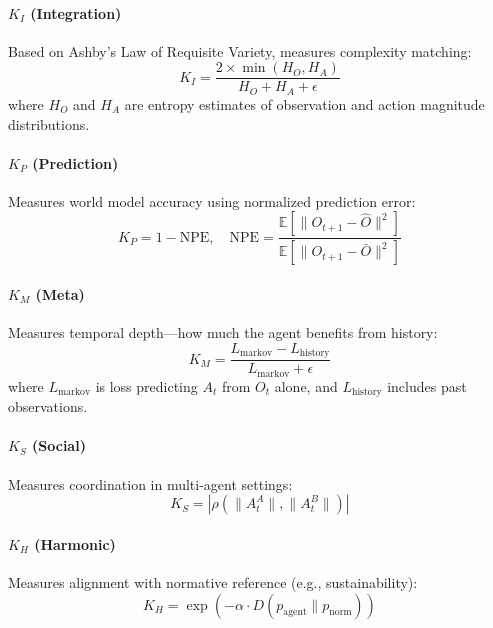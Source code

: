 \documentclass[11pt,a4paper]{article}
\newcommand{\ki}{K_I}
\newcommand{\kp}{K_P}
\newcommand{\km}{K_M}
\newcommand{\ks}{K_S}
\newcommand{\kh}{K_H}
\begin{document}
\paragraph{$\ki$ (Integration)} Based on Ashby's Law of Requisite Variety, measures complexity matching:
\begin{equation}
\ki = \frac{2 \times \min(H_O, H_A)}{H_O + H_A + \epsilon}
\end{equation}
where $H_O$ and $H_A$ are entropy estimates of observation and action magnitude distributions.

\paragraph{$\kp$ (Prediction)} Measures world model accuracy using normalized prediction error:
\begin{equation}
\kp = 1 - \text{NPE}, \quad \text{NPE} = \frac{\mathbb{E}[\|O_{t+1} - \hat{O}\|^2]}{\mathbb{E}[\|O_{t+1} - \bar{O}\|^2]}
\end{equation}

\paragraph{$\km$ (Meta)} Measures temporal depth---how much the agent benefits from history:
\begin{equation}
\km = \frac{L_{\text{markov}} - L_{\text{history}}}{L_{\text{markov}} + \epsilon}
\end{equation}
where $L_{\text{markov}}$ is loss predicting $A_t$ from $O_t$ alone, and $L_{\text{history}}$ includes past observations.

\paragraph{$\ks$ (Social)} Measures coordination in multi-agent settings:
\begin{equation}
\ks = |\rho(\|A^A_t\|, \|A^B_t\|)|
\end{equation}

\paragraph{$\kh$ (Harmonic)} Measures alignment with normative reference (e.g., sustainability):
\begin{equation}
\kh = \exp(-\alpha \cdot D(p_{\text{agent}} \| p_{\text{norm}}))
\end{equation}
\end{document}
